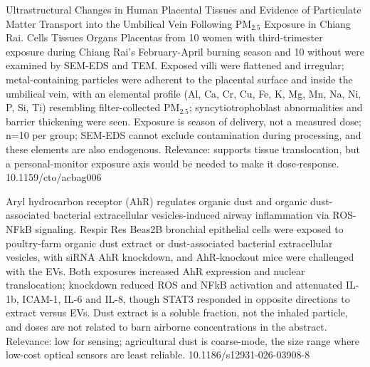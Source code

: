 \documentclass[10pt]{article}
\begin{document}

{Ultrastructural Changes in Human Placental Tissues and Evidence of Particulate Matter Transport into the Umbilical Vein Following PM$_{2.5}$ Exposure in Chiang Rai.}
{Cells Tissues Organs}
{Placentas from 10 women with third-trimester exposure during Chiang Rai's February-April burning season and 10 without were examined by SEM-EDS and TEM. Exposed villi were flattened and irregular; metal-containing particles were adherent to the placental surface and inside the umbilical vein, with an elemental profile (Al, Ca, Cr, Cu, Fe, K, Mg, Mn, Na, Ni, P, Si, Ti) resembling filter-collected PM$_{2.5}$; syncytiotrophoblast abnormalities and barrier thickening were seen. Exposure is season of delivery, not a measured dose; n=10 per group; SEM-EDS cannot exclude contamination during processing, and these elements are also endogenous. Relevance: supports tissue translocation, but a personal-monitor exposure axis would be needed to make it dose-response.}
{10.1159/cto/acbag006}


{Aryl hydrocarbon receptor (AhR) regulates organic dust and organic dust-associated bacterial extracellular vesicles-induced airway inflammation via ROS-NFkB signaling.}
{Respir Res}
{Beas2B bronchial epithelial cells were exposed to poultry-farm organic dust extract or dust-associated bacterial extracellular vesicles, with siRNA AhR knockdown, and AhR-knockout mice were challenged with the EVs. Both exposures increased AhR expression and nuclear translocation; knockdown reduced ROS and NFkB activation and attenuated IL-1b, ICAM-1, IL-6 and IL-8, though STAT3 responded in opposite directions to extract versus EVs. Dust extract is a soluble fraction, not the inhaled particle, and doses are not related to barn airborne concentrations in the abstract. Relevance: low for sensing; agricultural dust is coarse-mode, the size range where low-cost optical sensors are least reliable.}
{10.1186/s12931-026-03908-8}

\end{document}
